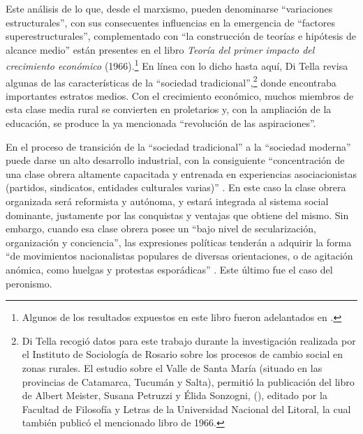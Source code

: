Este análisis de lo que, desde el marxismo, pueden denominarse \enquote{variaciones estructurales}, con sus consecuentes influencias en la emergencia de \enquote{factores superestructurales}, complementado con \enquote{la construcción de teorías e hipótesis de alcance medio} \parencite[16]{1655-DITELLA1966} están presentes en el libro \emph{Teoría del primer impacto del crecimiento económico} (1966).\footnote{Algunos de los resultados expuestos en este libro fueron adelantados en \textcite{1656-DITELLA1961}.} En línea con lo dicho hasta aquí, Di Tella revisa algunas de las características de la \enquote{sociedad tradicional},\footnote{Di Tella recogió datos para este trabajo durante la investigación realizada por el Instituto de Sociología de Rosario sobre los procesos de cambio social en zonas rurales. El estudio sobre el Valle de Santa María (situado en las provincias de Catamarca, Tucumán y Salta), permitió la publicación del libro de Albert Meister, Susana Petruzzi y Élida Sonzogni,  (\citeyear{1701-MEISTER1963}), editado por la Facultad de Filosofía y Letras de la Universidad Nacional del Litoral, la cual también publicó el mencionado libro de 1966.} donde encontraba importantes estratos medios. Con el crecimiento económico, muchos miembros de esta clase media rural se convierten en proletarios y, con la ampliación de la educación, se produce la ya mencionada \enquote{revolución de las aspiraciones}.

En el proceso de transición de la \enquote{sociedad tradicional} a la \enquote{sociedad moderna} puede darse un alto desarrollo industrial, con la consiguiente \enquote{concentración de una clase obrera altamente capacitada y entrenada en experiencias asociacionistas (partidos, sindicatos, entidades culturales varias)} \parencite[161]{1655-DITELLA1966}. En este caso la clase obrera organizada será reformista y autónoma, y estará integrada al sistema social dominante, justamente por las conquistas y ventajas que obtiene del mismo. Sin embargo, cuando esa clase obrera posee un \enquote{bajo nivel de secularización, organización y conciencia}, las expresiones políticas tenderán a adquirir la forma \enquote{de movimientos nacionalistas populares de diversas orientaciones, o de agitación anómica, como huelgas y protestas esporádicas} \parencite[162]{1655-DITELLA1966}. Este último fue el caso del peronismo.

